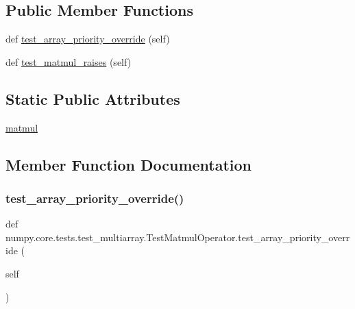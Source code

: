 \subsection*{Public Member Functions}
\begin{DoxyCompactItemize}
\item 
def \hyperlink{classnumpy_1_1core_1_1tests_1_1test__multiarray_1_1TestMatmulOperator_a467e782b9f136aeede9665957999e898}{test\+\_\+array\+\_\+priority\+\_\+override} (self)
\item 
def \hyperlink{classnumpy_1_1core_1_1tests_1_1test__multiarray_1_1TestMatmulOperator_a257d3d1f93c7d9ec599919c836317bf7}{test\+\_\+matmul\+\_\+raises} (self)
\end{DoxyCompactItemize}
\subsection*{Static Public Attributes}
\begin{DoxyCompactItemize}
\item 
\hyperlink{classnumpy_1_1core_1_1tests_1_1test__multiarray_1_1TestMatmulOperator_a84aa7ea6e0176fa6fadfc9faafd56937}{matmul}
\end{DoxyCompactItemize}


\subsection{Member Function Documentation}
\mbox{\label{classnumpy_1_1core_1_1tests_1_1test__multiarray_1_1TestMatmulOperator_a467e782b9f136aeede9665957999e898}} 
\subsubsection{\texorpdfstring{test\+\_\+array\+\_\+priority\+\_\+override()}{test\_array\_priority\_override()}}
{\footnotesize\ttfamily def numpy.\+core.\+tests.\+test\+\_\+multiarray.\+Test\+Matmul\+Operator.\+test\+\_\+array\+\_\+priority\+\_\+override (\begin{DoxyParamCaption}\item[{}]{self }\end{DoxyParamCaption})}

